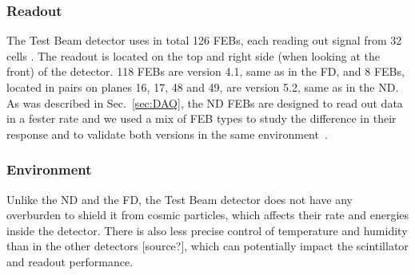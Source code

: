 \subsubsection*{Readout}
The Test Beam detector uses in total 126 \gls{FEB}s, each reading out signal from 32 cells \cite{NOvA-doc-29543}. The readout is located on the top and right side (when looking at the front) of the detector. 118 \gls{FEB}s are version 4.1, same as in the \gls{FD}, and 8 \gls{FEB}s, located in pairs on planes 16, 17, 48 and 49, are version 5.2, same as in the \gls{ND}. As was described in Sec.~\ref{sec:DAQ}, the \gls{ND} \gls{FEB}s are designed to read out data in a fester rate and we used a mix of \gls{FEB} types to study the difference in their response and to validate both versions in the same environment~\cite{LackeyThesisNOvATBProtons2022.pdf}.


\subsubsection*{Environment}
Unlike the \gls{ND} and the \gls{FD}, the Test Beam detector does not have any overburden to shield it from cosmic particles, which affects their rate and energies inside the detector. There is also less precise control of temperature and humidity than in the other detectors [source?], which can potentially impact the scintillator and readout performance.




